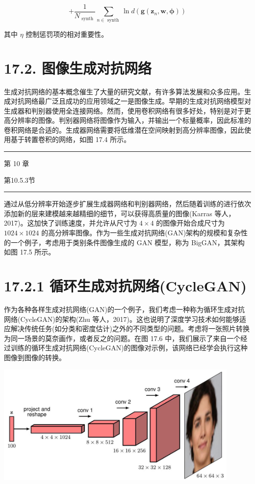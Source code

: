 \documentclass[10pt]{report}
\newcommand{\HRule}{\begin{center}\rule{0.9\linewidth}{0.2mm}\end{center}}
\begin{document}
\[
+ \frac{1}{{N}_{\text{ synth }}}\mathop{\sum }\limits_{{n \in  \text{ synth }}}\ln d\left( {\mathbf{g}\left( {{\mathbf{z}}_{n},\mathbf{w},\mathbf{\phi }}\right) }\right)  \tag{17.11}
\]

其中 \(\eta\) 控制惩罚项的相对重要性。

\section*{17.2. 图像生成对抗网络}

生成对抗网络的基本概念催生了大量的研究文献，有许多算法发展和众多应用。生成对抗网络最广泛且成功的应用领域之一是图像生成。早期的生成对抗网络模型对生成器和判别器使用全连接网络。然而，使用卷积网络有很多好处，特别是对于更高分辨率的图像。判别器网络将图像作为输入，并输出一个标量概率，因此标准的卷积网络是合适的。生成器网络需要将低维潜在空间映射到高分辨率图像，因此使用基于转置卷积的网络，如图 17.4 所示。

\HRule

第 10 章

第10.5.3节

\HRule

通过从低分辨率开始逐步扩展生成器网络和判别器网络，然后随着训练的进行依次添加新的层来建模越来越精细的细节，可以获得高质量的图像(Karras 等人，2017)。这加快了训练速度，并允许从尺寸为 \(4 \times  4\) 的图像开始合成尺寸为 \({1024} \times  {1024}\) 的高分辨率图像。作为一些生成对抗网络(GAN)架构的规模和复杂性的一个例子，考虑用于类别条件图像生成的 GAN 模型，称为 BigGAN，其架构如图 17.5 所示。

\section*{17.2.1 循环生成对抗网络(CycleGAN)}

作为各种各样生成对抗网络(GAN)的一个例子，我们考虑一种称为循环生成对抗网络(CycleGAN)的架构(Zhu 等人，2017)。这也说明了深度学习技术如何能够适应解决传统任务(如分类和密度估计)之外的不同类型的问题。考虑将一张照片转换为同一场景的莫奈画作，或者反之的问题。在图 17.6 中，我们展示了来自一个经过训练的循环生成对抗网络(CycleGAN)的图像对示例，该网络已经学会执行这种图像到图像的转换。

\begin{center}
\includegraphics[max width=0.9\textwidth]{images/0194e279-9b28-703a-88f4-c3ac21e2010d_558_329_1340_1136_565_0.jpg}
\end{center}
\hspace*{3em} 
\end{document}
